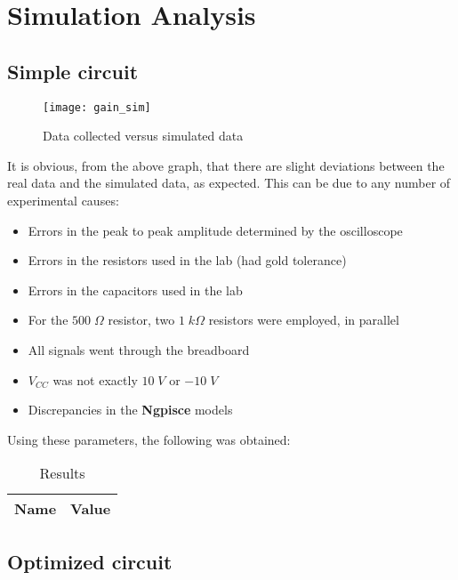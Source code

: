\newpage

\section{Simulation Analysis}
\label{sec:simulation}

\subsection{Simple circuit}

\begin{figure}[H]
\centering
\texttt{[image: gain\_sim]}
\caption{Data collected versus simulated data}
\label{data_graph_sim}
\end{figure}

It is obvious, from the above graph, that there are slight deviations between the real data and the simulated data, as expected. This can be due to any number of experimental causes:

\begin{itemize}

\item Errors in the peak to peak amplitude determined by the oscilloscope

\item Errors in the resistors used in the lab (had gold tolerance)

\item Errors in the capacitors used in the lab

\item For the $500\;\Omega$ resistor, two $1\;k\Omega$ resistors were employed, in parallel

\item All signals went through the breadboard

\item $V_{CC}$ was not exactly $10\;V$ or $-10\;V$

\item Discrepancies in the {\bf Ngpisce} models

\end{itemize}

Using these parameters, the following was obtained:

\begin{table}[H]
  \centering
  \begin{tabular}{|c|c|}
    \hline
        {\bf Name} & {\bf Value} \\
        \hline
        \hline
        
        \hline
  \end{tabular}
  \caption{Results}
  \label{sim_results}
\end{table}

\subsection{Optimized circuit}
